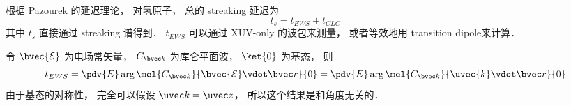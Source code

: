 
\begin{issues}
\issueDraft
\end{issues}


根据 Pazourek 的延迟理论， 对氢原子， 总的 streaking 延迟为
\begin{equation}
t_s = t_{EWS} + t_{CLC}
\end{equation}
其中 $t_s$ 直接通过 streaking 谱得到． $t_{EWS}$ 可以通过 XUV-only 的波包来测量， 或者等效地用 transition dipole来计算．

令 $\bvec{\mathcal E}$ 为电场常矢量， $C_{\bvec k}$ 为库仑平面波， $\ket{0}$ 为基态， 则
\begin{equation}\label{HyCLC_eq1}
t_{EWS} = \pdv{E} \arg \mel{C_{\bvec k}}{\bvec{\mathcal E}\vdot \bvec r}{0} = \pdv{E} \arg \mel{C_{\bvec k}}{\uvec{k}\vdot \bvec r}{0}
\end{equation}
由于基态的对称性， 完全可以假设 $\uvec k = \uvec z$， 所以这个结果是和角度无关的．
